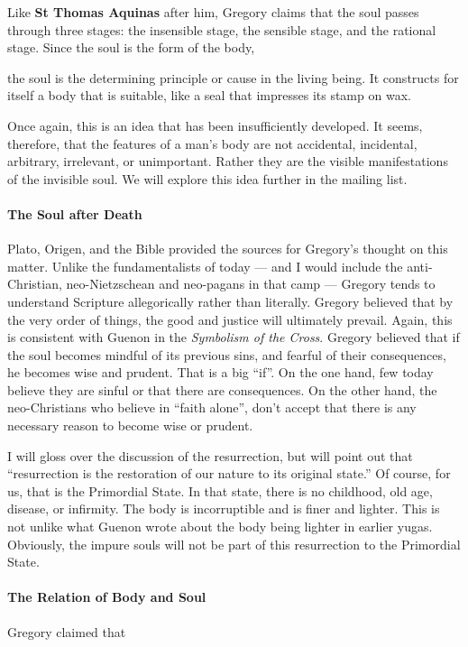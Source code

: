 Like \textbf{St Thomas Aquinas} after him, Gregory claims that the soul passes through three stages: the insensible stage, the sensible stage, and the rational stage. Since the soul is the form of the body,

\begin{quotex}
the soul is the determining principle or cause in the living being. It constructs for itself a body that is suitable, like a seal that impresses its stamp on wax. 

\end{quotex}
Once again, this is an idea that has been insufficiently developed. It seems, therefore, that the features of a man's body are not accidental, incidental, arbitrary, irrelevant, or unimportant. Rather they are the visible manifestations of the invisible soul. We will explore this idea further in the mailing list.

\paragraph{The Soul after Death}
Plato, Origen, and the Bible provided the sources for Gregory's thought on this matter. Unlike the fundamentalists of today — and I would include the anti-Christian, neo-Nietzschean and neo-pagans in that camp — Gregory tends to understand Scripture allegorically rather than literally. Gregory believed that by the very order of things, the good and justice will ultimately prevail. Again, this is consistent with Guenon in the \emph{Symbolism of the Cross}. Gregory believed that if the soul becomes mindful of its previous sins, and fearful of their consequences, he becomes wise and prudent. That is a big “if”. On the one hand, few today believe they are sinful or that there are consequences. On the other hand, the neo-Christians who believe in “faith alone”, don't accept that there is any necessary reason to become wise or prudent.

I will gloss over the discussion of the resurrection, but will point out that “resurrection is the restoration of our nature to its original state.” Of course, for us, that is the Primordial State. In that state, there is no childhood, old age, disease, or infirmity. The body is incorruptible and is finer and lighter. This is not unlike what Guenon wrote about the body being lighter in earlier yugas. Obviously, the impure souls will not be part of this resurrection to the Primordial State.

\paragraph{The Relation of Body and Soul}
Gregory claimed that

